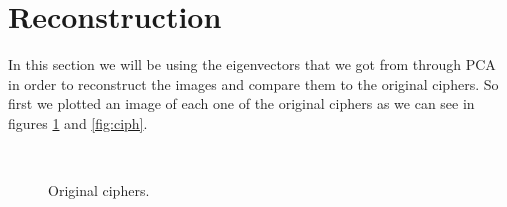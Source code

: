 \documentclass[paper=a4, fontsize=11pt]{scrartcl} %
\begin{document}
\section{Reconstruction}
In this section we will be using the eigenvectors that we got from through PCA in order to reconstruct the images and compare them to the original ciphers. So first we plotted an image of each one of the original ciphers as we can see in figures \ref{fig:ciph_o} and \ref{fig:ciph}.
\begin{figure}[h]
    \centering
	\\
    
    \caption{Original ciphers.}
    \label{fig:ciph_o}
\end{figure}
\end{document}
